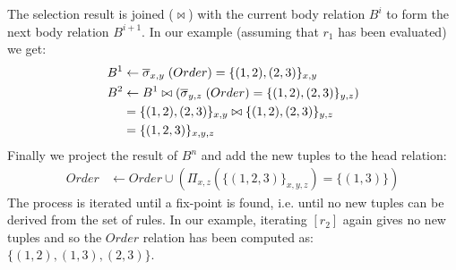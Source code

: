 The selection result is joined ($\bowtie$) with the current body relation $B^{i}$ to form the next body relation $B^{i + 1}$. In our example (assuming that $r_1$ has been evaluated) we get:
\begin{align*}
B^{1} &\leftarrow \overline{\sigma}_{x, y}\;(Order) = \{(1, 2), (2, 3)\}_{x, y}\\
B^{2} &\leftarrow B^{1} \bowtie (\overline{\sigma}_{y, z}\;(Order) = \{(1, 2), (2, 3)\}_{y, z})\\
      &= \{(1, 2), (2, 3)\}_{x, y} \bowtie \{(1, 2), (2, 3)\}_{y, z}\\
      &= \{(1,2,3)\}_{x,y,z}
\end{align*}
\noindent
Finally we project the result of $B^n$ and add the new tuples to the head relation:
\begin{align*}
Order & \leftarrow Order \cup (\Pi_{x,z}(\{(1,2,3)\}_{x,y,z}) = \{(1,3)\})
\end{align*}
\noindent
The process is iterated until a fix-point is found, i.e. until no new tuples can be derived from the set of rules. In our example, iterating $[r_2]$ again gives no new tuples and so the $Order$ relation has been computed as: $\{(1,2), (1,3), (2,3) \}$.
\clearpage
